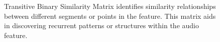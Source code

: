 \begin{figure}[ht]
\begin{minipage}{0.45\textwidth}
        \caption[Transitive Binary Similarity Matrix]{Transitive Binary Similarity Matrix identifies similarity relationships between different segments or points in the feature. This matrix aids in discovering recurrent patterns or structures within the audio feature.}
    \end{minipage}
\end{figure}

\newpage